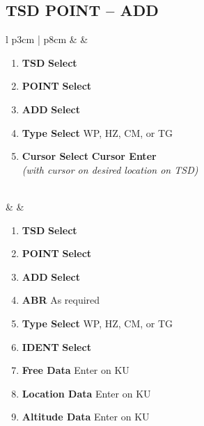 \documentclass[fontHelvetica]{TechCheck}
\begin{document}
	\subsection{TSD POINT -- ADD}
	\begin{center}
		\begin{longtable}{l p{3cm} | p{8cm}}
			\toprule
			\textbf{\textbullet} &  &
			\begin{minipage}[t]{\linewidth}
				\vspace{-7pt}
				\begin{enumerate}
					\item \textbf{TSD} \dotfill \textbf{Select}
					\item \textbf{POINT} \dotfill \textbf{Select}
					\item \textbf{ADD} \dotfill \textbf{Select}
					\item \textbf{Type Select} \dotfill WP, HZ, CM, or TG 
					\item \textbf{Cursor Select} \dotfill \textbf{Cursor Enter} \\
					\hfill \emph{(with cursor on desired location on TSD)}
				\end{enumerate}
			\end{minipage} \\
			\midrule
			\textbf{\textbullet} &  &
			\begin{minipage}[t]{\linewidth}
				\vspace{-7pt}
				\begin{enumerate}
					\item \textbf{TSD} \dotfill \textbf{Select}
					\item \textbf{POINT} \dotfill \textbf{Select}
					\item \textbf{ADD} \dotfill \textbf{Select}
					\item \textbf{ABR} \dotfill As required
					\item \textbf{Type Select} \dotfill WP, HZ, CM, or TG 
					\item \textbf{IDENT} \dotfill \textbf{Select}
					\item \textbf{Free Data} \dotfill Enter on KU
					\item \textbf{Location Data} \dotfill Enter on KU
					\item \textbf{Altitude Data} \dotfill Enter on KU
				\end{enumerate}
			\end{minipage} \\
			\bottomrule
		\end{longtable}
	\end{center}
\end{document}
